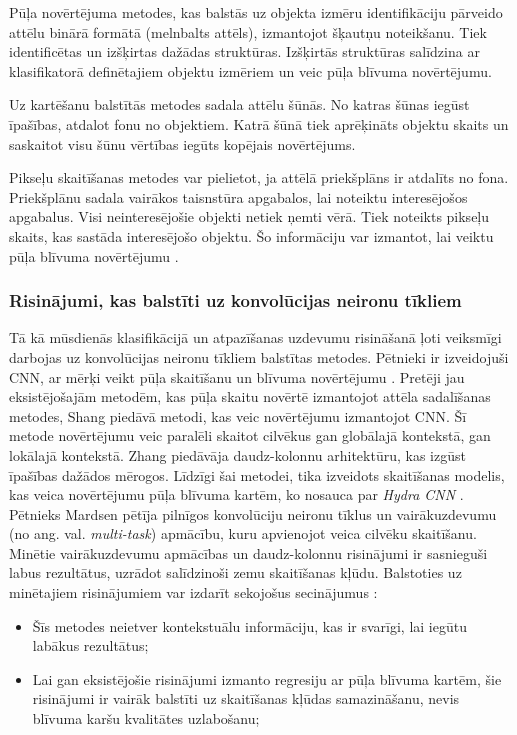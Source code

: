 Pūļa novērtējuma metodes, kas balstās uz objekta izmēru identifikāciju pārveido attēlu binārā formātā (melnbalts attēls), izmantojot šķautņu noteikšanu. Tiek identificētas un izšķirtas dažādas struktūras. Izšķirtās struktūras salīdzina ar klasifikatorā definētajiem objektu izmēriem un veic pūļa blīvuma novērtējumu.

Uz kartēšanu balstītās metodes sadala attēlu šūnās. No katras šūnas iegūst īpašības, atdalot fonu no objektiem. Katrā šūnā tiek aprēķināts objektu skaits un saskaitot visu šūnu vērtības iegūts kopējais novērtējums. 

Pikseļu skaitīšanas metodes var pielietot, ja attēlā priekšplāns ir atdalīts no fona. Priekšplānu sadala vairākos taisnstūra apgabalos, lai noteiktu interesējošos apgabalus. Visi neinteresējošie objekti netiek ņemti vērā. Tiek noteikts pikseļu skaits, kas sastāda interesējošo objektu. Šo informāciju var izmantot, lai veiktu pūļa blīvuma novērtējumu \cite{ma2004pixel}. 
\subsubsection{Risinājumi, kas balstīti uz konvolūcijas neironu tīkliem}
Tā kā mūsdienās klasifikācijā un atpazīšanas uzdevumu risināšanā ļoti veiksmīgi darbojas uz konvolūcijas neironu tīkliem balstītas metodes. Pētnieki ir izveidojuši CNN, ar mērķi veikt pūļa skaitīšanu un blīvuma novērtējumu \cite{wang2015deep,shang2016end,walach2016learning}. Pretēji jau eksistējošajām metodēm, kas pūļa skaitu novērtē izmantojot attēla sadalīšanas metodes, Shang \cite{shang2016end} piedāvā metodi, kas veic novērtējumu izmantojot CNN. Šī metode novērtējumu veic paralēli skaitot cilvēkus gan globālajā kontekstā, gan lokālajā kontekstā. Zhang \cite{zhang2016single} piedāvāja daudz-kolonnu arhitektūru, kas izgūst īpašības dažādos mērogos. Līdzīgi šai metodei, tika izveidots skaitīšanas modelis, kas veica novērtējumu pūļa blīvuma kartēm, ko nosauca par \textit{Hydra CNN} \cite{onoro2016towards}. Pētnieks Mardsen \cite{marsden2017resnetcrowd} pētīja pilnīgos konvolūciju neironu tīklus un vairākuzdevumu (no ang. val. \textit{multi-task}) apmācību, kuru apvienojot veica cilvēku skaitīšanu. Minētie vairākuzdevumu apmācības un daudz-kolonnu risinājumi ir sasnieguši labus rezultātus, uzrādot salīdzinoši zemu skaitīšanas kļūdu. Balstoties uz minētajiem risinājumiem var izdarīt sekojošus secinājumus \cite{sindagi2017generating}:
\begin{itemize}
	\item Šīs metodes neietver kontekstuālu informāciju, kas ir svarīgi, lai iegūtu labākus rezultātus;
	\item Lai gan eksistējošie risinājumi izmanto regresiju ar pūļa blīvuma kartēm, šie risinājumi ir vairāk balstīti uz skaitīšanas kļūdas samazināšanu, nevis blīvuma karšu kvalitātes uzlabošanu;
\end{itemize}


